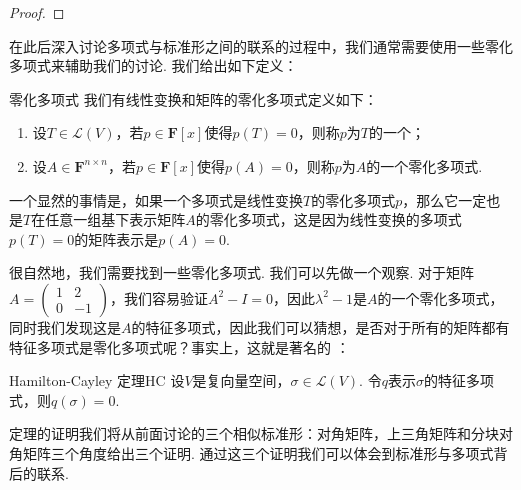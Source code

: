 \begin{proof}

\end{proof}

在此后深入讨论多项式与标准形之间的联系的过程中，我们通常需要使用一些零化多项式来辅助我们的讨论. 我们给出如下定义：
\begin{definition}{零化多项式}{} 
    我们有线性变换和矩阵的零化多项式定义如下：
    \begin{enumerate}
        \item 设$T\in \mathcal{L}(V)$，若$p\in\mathbf{F}[x]$使得$p(T)=0$，则称$p$为$T$的一个；

        \item 设$A\in\mathbf{F}^{n\times n}$，若$p\in\mathbf{F}[x]$使得$p(A)=0$，则称$p$为$A$的一个零化多项式.
    \end{enumerate}
\end{definition}

一个显然的事情是，如果一个多项式是线性变换$T$的零化多项式$p$，那么它一定也是$T$在任意一组基下表示矩阵$A$的零化多项式，这是因为线性变换的多项式$p(T)=0$的矩阵表示是$p(A)=0$.

很自然地，我们需要找到一些零化多项式. 我们可以先做一个观察. 对于矩阵$A=\begin{pmatrix}
        1 & 2 \\ 0 & -1
    \end{pmatrix}$，我们容易验证$A^2-I=0$，因此$\lambda^2-1$是$A$的一个零化多项式，同时我们发现这是$A$的特征多项式，因此我们可以猜想，是否对于所有的矩阵都有特征多项式是零化多项式呢？事实上，这就是著名的 ：
\begin{theorem}{Hamilton-Cayley 定理}{HC} 
    设$V$是复向量空间，$\sigma\in \mathcal{L}(V)$. 令$q$表示$\sigma$的特征多项式，则$q(\sigma)=0$.
\end{theorem}
定理的证明我们将从前面讨论的三个相似标准形：对角矩阵，上三角矩阵和分块对角矩阵三个角度给出三个证明. 通过这三个证明我们可以体会到标准形与多项式背后的联系.

